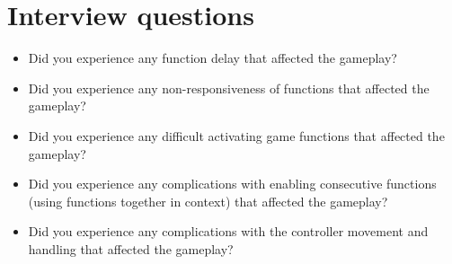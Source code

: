 \section{Interview questions} \label{app:questions}
\begin{itemize}
\item Did you experience any function delay that affected the gameplay?
\item Did you experience any non-responsiveness of functions that affected the gameplay?
\item Did you experience any difficult activating game functions that affected the gameplay?
\item Did you experience any complications with enabling consecutive functions (using functions together in context) that affected the gameplay?
\item Did you experience any complications with the controller movement and handling that affected the gameplay?
\end{itemize}